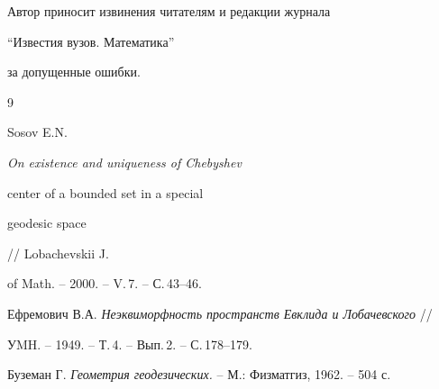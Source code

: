 Автор приносит извинения читателям и редакции журнала


``Известия вузов. Математика'' 


за допущенные ошибки.





\begin{thebibliography}{9}







Sosov E.N. {\it On existence and uniqueness of Chebyshev 


center of a bounded set in a special


geodesic space} // Lobachevskii J.


of Math. -- 2000. -- V.\,7. -- С.\,43--46.




Ефремович В.А. {\it Неэквиморфность пространств Евклида и Лобачевского} //


УMH. -- 1949. -- Т.\,4. -- Вып.\,2. -- С.\,178--179.




Буземан Г. {\it Геометрия геодезических.} -- М.: Физматгиз, 1962. -- 504 с. 








\end{thebibliography}





\vskip 2cm












\label{end}














